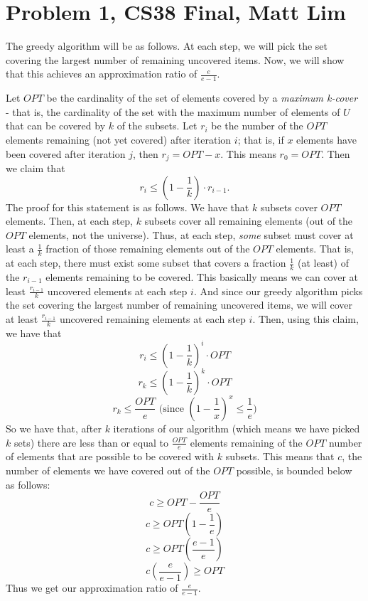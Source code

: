 \documentclass{article}
\begin{document}
\section*{Problem 1, CS38 Final, Matt Lim}
The greedy algorithm will be as follows. At each step, we will pick the set
covering the largest number of remaining uncovered items. Now, we will show that
this achieves an approximation ratio of $\frac{e}{e-1}$.

Let $OPT$ be the cardinality of the set of elements covered by a
\textit{maximum k-cover} - that is, the cardinality of the set
with the maximum number of elements of $U$ that can be covered by $k$ of the
subsets. Let $r_i$ be the number of the $OPT$ elements remaining (not yet
covered) after iteration $i$; that is, if $x$ elements have been covered after
iteration $j$, then $r_j = OPT - x$. This means $r_0 = OPT$. Then we claim that
\[ r_i \leq (1 - \frac{1}{k}) \cdot r_{i-1}. \]
The proof for this statement is as follows. We have
that $k$ subsets cover $OPT$ elements. Then, at each step, $k$ subsets cover
all remaining elements (out of the $OPT$ elements, not the universe).
Thus, at each step, \textit{some} subset must cover at least a $\frac{1}{k}$
fraction of those remaining elements out of the $OPT$ elements. That is, at
each step, there
must exist some subset that covers a fraction $\frac{1}{k}$ (at least) of the $r_{i-1}$
elements remaining to be covered. This basically means we can cover at least
$\frac{r_{i-1}}{k}$ uncovered elements at each step $i$. And since our
greedy algorithm picks the set covering the largest number of remaining
uncovered items, we will cover at least $\frac{r_{i-1}}{k}$ uncovered remaining
elements at each step $i$. Then, using this claim, we have that
\[ r_i \leq (1 - \frac{1}{k})^i \cdot OPT \]
\[ r_k \leq (1 - \frac{1}{k})^k \cdot OPT \]
\[ r_k \leq \frac{OPT}{e} \text{ (since } (1-\frac{1}{x})^x \leq \frac{1}{e})\]
So we have that, after $k$ iterations of our algorithm (which means we have
picked $k$ sets) there are less than or equal to $\frac{OPT}{e}$ elements
remaining of the $OPT$ number of elements that are possible to be covered with
$k$ subsets. This means that $c$, the number of elements we have
covered out of the $OPT$ possible, is bounded below as follows:
\[ c \geq OPT - \frac{OPT}{e} \]
\[ c \geq OPT(1 - \frac{1}{e}) \]
\[ c \geq OPT(\frac{e-1}{e}) \]
\[ c(\frac{e}{e-1}) \geq OPT \]
Thus we get our approximation ratio of $\frac{e}{e-1}$.
\newpage

\end{document}
